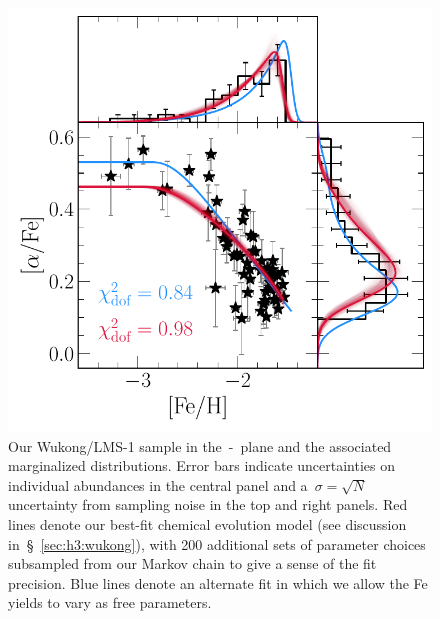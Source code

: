 \documentclass[foo.tex]{subfiles}
\begin{document}
\begin{figure}
\centering
\includegraphics[scale = 0.65]{wukong_bestfit.pdf}
\caption{
Our Wukong/LMS-1 sample in the~\afe-\feh~plane and the associated marginalized
distributions.
Error bars indicate uncertainties on individual abundances in the central panel
and a~$\sigma = \sqrt{N}$ uncertainty from sampling noise in the top and right
panels.
Red lines denote our best-fit chemical evolution model (see discussion
in~\S~\ref{sec:h3:wukong}), with 200 additional sets of parameter choices
subsampled from our Markov chain to give a sense of the fit precision.
Blue lines denote an alternate fit in which we allow the Fe yields to vary as
free parameters.
}
\label{fig:wukong}
\end{figure}
\end{document}
